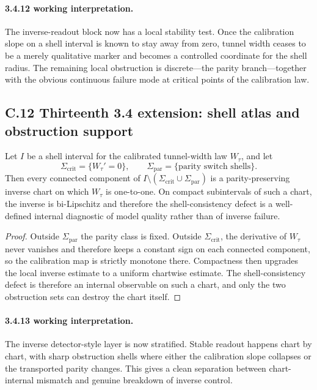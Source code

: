 \paragraph{3.4.12 working interpretation.}
The inverse-readout block now has a local stability test. Once the calibration slope on a shell interval is known to stay away from zero, tunnel width ceases to be a merely qualitative marker and becomes a controlled coordinate for the shell radius. The remaining local obstruction is discrete---the parity branch---together with the obvious continuous failure mode at critical points of the calibration law.

\subsection*{C.12 Thirteenth 3.4 extension: shell atlas and obstruction support}

\begin{theorem}
\label{thm:appendix-3413}
Let $I$ be a shell interval for the calibrated tunnel-width law $W_\tau$, and let
\[
  \Sigma_{\mathrm{crit}}=\{W_\tau'=0\},
  \qquad
  \Sigma_{\mathrm{par}}=\{\text{parity switch shells}\}.
\]
Then every connected component of $I\setminus(\Sigma_{\mathrm{crit}}\cup\Sigma_{\mathrm{par}})$ is a parity-preserving inverse chart on which $W_\tau$ is one-to-one. On compact subintervals of such a chart, the inverse is bi-Lipschitz and therefore the shell-consistency defect is a well-defined internal diagnostic of model quality rather than of inverse failure.
\end{theorem}

\begin{proof}
Outside $\Sigma_{\mathrm{par}}$ the parity class is fixed. Outside $\Sigma_{\mathrm{crit}}$, the derivative of $W_\tau$ never vanishes and therefore keeps a constant sign on each connected component, so the calibration map is strictly monotone there. Compactness then upgrades the local inverse estimate to a uniform chartwise estimate. The shell-consistency defect is therefore an internal observable on such a chart, and only the two obstruction sets can destroy the chart itself.
\end{proof}

\paragraph{3.4.13 working interpretation.}
The inverse detector-style layer is now stratified. Stable readout happens chart by chart, with sharp obstruction shells where either the calibration slope collapses or the transported parity changes. This gives a clean separation between chart-internal mismatch and genuine breakdown of inverse control.

